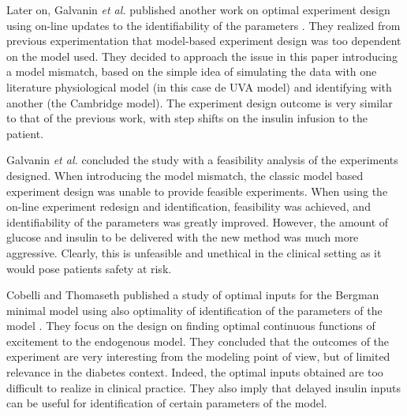 Later on, Galvanin \textit{et al.} published another work on optimal experiment design using on-line updates to the identifiability of the parameters \cite{galvanin2011optimal}. They realized from previous experimentation that model-based experiment design was too dependent on the model used. They decided to approach the issue in this paper introducing a model mismatch, based on the simple idea of simulating the data with one literature physiological model (in this case de UVA model) and identifying with another (the Cambridge model). The experiment design outcome is very similar to that of the previous work, with step shifts on the insulin infusion to the patient. %

Galvanin \textit{et al.} concluded the study with a feasibility analysis of the experiments designed. When introducing the model mismatch, the classic model based experiment design was unable to provide feasible experiments. When using the on-line experiment redesign and identification, feasibility was achieved, and identifiability of the parameters was greatly improved. However, the amount of glucose and insulin to be delivered with the new method was much more aggressive. Clearly, this is unfeasible and unethical in the clinical setting as it would pose patients safety at risk.

Cobelli and Thomaseth published a study of optimal inputs for the Bergman minimal model using also optimality of identification of the parameters of the model \cite{cobelli1987minimal}. They focus on the design on finding optimal continuous functions of excitement to the endogenous model. They concluded that the outcomes of the experiment are very interesting from the modeling point of view, but of limited relevance in the diabetes context. Indeed, the optimal inputs obtained are too difficult to realize in clinical practice. They also imply that delayed insulin inputs can be useful for identification of certain parameters of the model.

